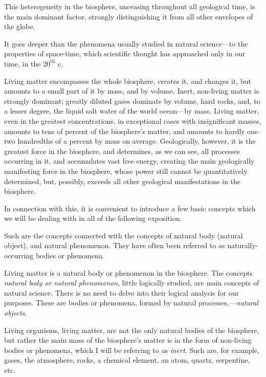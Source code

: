 This heterogeneity in the biosphere, unceasing throughout all geological time,
is the main dominant factor, strongly distinguishing it from all other
envelopes of the globe.

It goes deeper than the phenomena usually studied in natural science---to the
properties of space-time, which scientific thought has approached only in our
time, in the $20^\mathrm{th}$ c.

Living matter encompasses the whole biosphere, creates it, and changes it, but
amounts to a small part of it by mass, and by volume.  Inert, non-living matter
is strongly dominant; greatly diluted gases dominate by volume, hard rocks,
and, to a lesser degree, the liquid salt water of the world ocean---by mass.
Living matter, even in the greatest concentrations, in exceptional cases with
insignificant masses, amounts to tens of percent of the biosphere's matter, and
amounts to hardly one--two hundredths of a percent by mass on average.
Geologically, however, it is the greatest force in the biosphere, and
determines, as we can see, all processes occurring in it, and accumulates vast
free energy, creating the main geologically manifesting force in the biosphere,
whose power still cannot be quantitatively determined, but, possibly, exceeds
all other geological manifestations in the biosphere.

In connection with this, it is convenient to introduce a few basic concepts
which we will be dealing with in all of the following exposition.


\Section \label{sec:6} %
Such are the concepts connected with the concepts of natural body (natural
object), and natural
phenomenon.  They have often been referred to
as naturally-occurring bodies or phenomena.

Living matter is a natural body or phenomenon in the biosphere.  The concepts
\emph{natural body or natural phenomenon}, little logically studied, are main
concepts of natural science.  There is no need to delve into their logical
analysis for our purposes.  These are bodies or phenomena, formed by natural
processes,---\emph{natural objects}.

Living organisms, living matter, are not the only natural bodies of the
biosphere, but rather the main mass of the biosphere's matter is in the form of
non-living bodies or phenomena, which I will be referring to as
\emph{inert}.  Such are, for example, gases, the
atmosphere, rocks, a chemical element, an atom, quartz, serpentine, etc.

